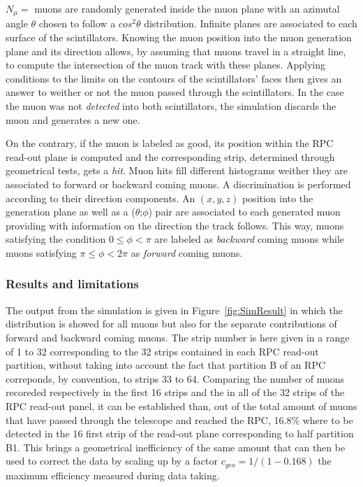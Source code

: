 	$N_{\mu}=$  muons are randomly generated inside the muon plane with an azimutal angle $\theta$ chosen to follow a $cos^2\theta$ distribution. Infinite planes are associated to each surface of the scintillators. Knowing the muon position into the muon generation plane and its direction allows, by assuming that muons travel in a straight line, to compute the intersection of the muon track with these planes. Applying conditions to the limits on the contours of the scintillators' faces then gives an answer to weither or not the muon passed through the scintillators. In the case the muon was not \textit{detected} into both scintillators, the simulation discards the muon and generates a new one.
	
	On the contrary, if the muon is labeled as good, its position within the RPC read-out plane is computed and the corresponding strip, determined through geometrical tests, gets a \textit{hit}. Muon hits fill different histograms weither they are associated to forward or backward coming muons. A discrimination is performed according to their direction components. An $(x,y,z)$ position  into the generation plane as well as a ($\theta$;$\phi$) pair are associated to each generated muon providing with information on the direction the track follows. This way, muons satisfying the condition $0\leq\phi<\pi$ are labeled as \textit{backward} coming muons while muons satisfying $\pi\leq\phi<2\pi$ as \textit{forward} coming muons.
		
		\subsubsection{Results and limitations}
		\label{chapt5:sssec:SimRes}
	
	The output from the simulation is given in Figure~\ref{fig:SimResult} in which the distribution is showed for all muons but also for the separate contributions of forward and backward coming muons. The strip number is here given in a range of 1 to 32 corresponding to the 32 strips contained in each RPC read-out partition, without taking into account the fact that partition B of an RPC correponds, by convention, to strips 33 to 64. Comparing the number of muons recoreded respectively in the first 16 strips and the in all of the 32 strips of the RPC read-out panel, it can be established than, out of the total amount of muons that have passed through the telescope and reached the RPC, 16.8\% where to be detected in the 16 first strip of the read-out plane corresponding to half partition B1. This brings a geometrical inefficiency of the same amount that can then be used to correct the data by scaling up by a factor $c_{geo} = 1/(1-0.168)$ the maximum efficiency measured during data taking.

